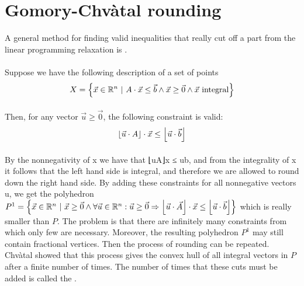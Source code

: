 \section{Gomory-Chv\`atal rounding}
A general method for finding valid inequalities that really cut off a part from the linear programming relaxation is .

\paragraph{}
Suppose we have the following description of a set of points
\begin{equation}
X=\left\{ \vec{x}\in\mathbb{R}^n\ |\ A\cdot\vec{x}\leq\vec{b}\wedge\vec{x}\geq\vec{0}\wedge\vec{x}\mbox{ integral} \right\}
\end{equation}

\paragraph{}
Then, for any vector $\vec{u}\geq\vec{0}$, the following constraint is valid:
\begin{equation}
\left\lfloor \vec{u}\cdot A \right\rfloor\cdot\vec{x}\leq\left\lfloor \vec{u}\cdot\vec{b} \right\rfloor
\end{equation}

\paragraph{}
By the nonnegativity of x we have that ⌊uA⌋x ≤ ub, and from the integrality of x it follows that the left hand side is integral, and therefore we are allowed to round down the right hand side. By adding these constraints for all nonnegative vectors u, we get the polyhedron $P^1=\left\{ \vec{x}\in\mathbb{R}^n\ |\ \vec{x}\geq\vec{0}\wedge\forall \vec{u}\in\mathbb{R}^n:\vec{u}\geq\vec{0}\Rightarrow\left\lfloor \vec{u}\cdot\vec{A} \right\rfloor\cdot\vec{x}\leq\left\lfloor \vec{u}\cdot\vec{b} \right\rfloor \right\}$ which is really smaller than $P$. The problem is that there are infinitely many constraints from which only few are necessary. Moreover, the resulting polyhedron $P^1$ may still contain fractional vertices. Then the process of rounding can be repeated. Chv\`atal showed that this process gives the convex hull of all integral vectors in $P$ after a finite number of times. The number of times that these cuts must be added is called the .

